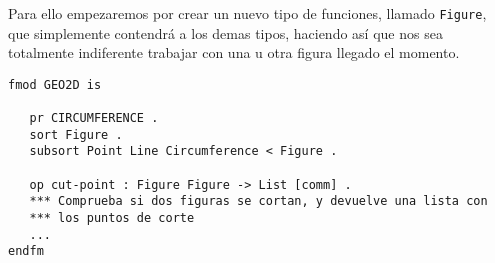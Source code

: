Para ello empezaremos por crear un nuevo tipo de funciones, llamado \texttt{Figure}, que simplemente contendrá a los demas tipos, haciendo así que nos sea totalmente indiferente trabajar con una u otra figura llegado el momento.\par
{\codesize
\begin{verbatim}
fmod GEO2D is

   pr CIRCUMFERENCE .
   sort Figure .
   subsort Point Line Circumference < Figure .

   op cut-point : Figure Figure -> List [comm] .
   *** Comprueba si dos figuras se cortan, y devuelve una lista con 
   *** los puntos de corte
   ...
endfm	
\end{verbatim}
}
